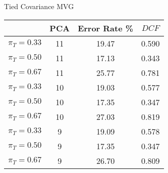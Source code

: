 \caption{Tied Covariance MVG}\label{tab:mvg_tiedcov}
\begin{center}
\begin{tabular}{|c|c||c|c|}
\hline
\ & PCA & Error Rate \% & $DCF$\\
\hline
$\pi_T = 0.33$ & 11 & 19.47 & 0.590 \\
$\pi_T = 0.50$ & 11 & 17.13 & 0.343 \\
$\pi_T = 0.67$ & 11 & 25.77 & 0.781 \\
\hline
$\pi_T = 0.33$ & 10 & 19.03 & 0.577 \\
$\pi_T = 0.50$ & 10 & 17.35 & 0.347 \\
$\pi_T = 0.67$ & 10 & 27.03 & 0.819 \\
\hline
$\pi_T = 0.33$ & 9 & 19.09 & 0.578 \\
$\pi_T = 0.50$ & 9 & 17.35 & 0.347 \\
$\pi_T = 0.67$ & 9 & 26.70 & 0.809 \\
\hline
\end{tabular}
\end{center}
